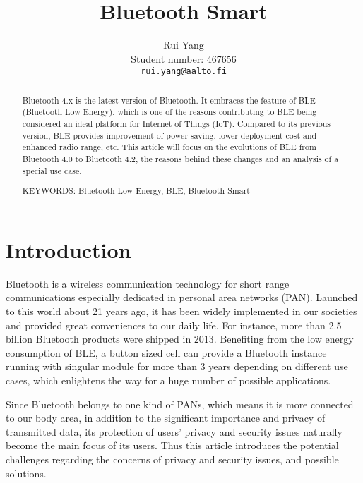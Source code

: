 \documentclass{cseminar}
\begin{document}

\title{Bluetooth Smart}

\author{Rui Yang\\
        Student number: 467656\\
	\texttt{rui.yang@aalto.fi}}
\maketitle


\begin{abstract}
Bluetooth 4.x is the latest version of Bluetooth. It embraces the feature of BLE (Bluetooth Low Energy), which is one of the reasons contributing to BLE being considered an ideal platform for Internet of Things (IoT). Compared to its previous version, BLE provides improvement of power saving, lower deployment cost and enhanced radio range, etc\cite{BLE03}. This article will focus on the evolutions of BLE from Bluetooth 4.0 to Bluetooth 4.2, the reasons behind these changes and an analysis of a special use case.

\vspace{3mm}
\noindent KEYWORDS: Bluetooth Low Energy, BLE, Bluetooth Smart

\end{abstract}


\section{Introduction}
Bluetooth is a wireless communication technology for short range communications especially dedicated in personal area networks (PAN). Launched to this world about 21 years ago, it has been widely implemented in our societies and provided great conveniences to our daily life. For instance, more than 2.5 billion Bluetooth products were shipped in 2013\cite{BLE04}. Benefiting from the low energy consumption of BLE, a button sized cell can provide a Bluetooth instance running with singular module for more than 3 years depending on different use cases\cite{BLE03}, which enlightens the way for a huge number of possible applications.


Since Bluetooth belongs to one kind of PANs, which means it is more connected to our body area, in addition to the significant importance and privacy of transmitted data, its protection of users' privacy and security issues naturally become the main focus of its users. Thus this article introduces the potential challenges regarding the concerns of privacy and security issues, and possible solutions.
\end{document}
